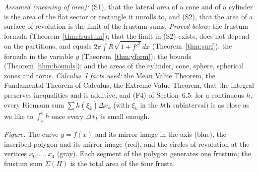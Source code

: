 \documentclass[11pt]{article}
\begin{document}
\begin{remark}
\emph{Assumed (meaning of area):} (S1), that the lateral area of a cone and of a cylinder is the area of the flat sector or rectangle it unrolls to, and (S2), that the area of a surface of revolution is the limit of the frustum sums. \emph{Proved below:} the frustum formula (Theorem~\ref{thm:frustum}); that the limit in (S2) exists, does not depend on the partitions, and equals $2\pi\int R\sqrt{1+f'^2}\,dx$ (Theorem~\ref{thm:surf}); the formula in the variable $y$ (Theorem~\ref{thm:yform}); the bounds (Theorem~\ref{thm:bounds}); and the areas of the cylinder, cone, sphere, spherical zones and torus. \emph{Calculus~I facts used:} the Mean Value Theorem, the Fundamental Theorem of Calculus, the Extreme Value Theorem, that the integral preserves inequalities and is additive, and (F4) of Section~6.5: for a continuous $h$, every Riemann sum $\sum h(\xi_k)\Delta x_k$ (with $\xi_k$ in the $k$th subinterval) is as close as we like to $\int_a^bh$ once every $\Delta x_k$ is small enough.
\end{remark}

\begin{center}
\par\small\emph{Figure.} The curve $y=f(x)$ and its mirror image in the axis (blue), the inscribed polygon and its mirror image (red), and the circles of revolution at the vertices $x_0,\dots,x_4$ (gray). Each segment of the polygon generates one frustum; the frustum sum $\Sigma(\Pi)$ is the total area of the four frusta.
\end{center}
\end{document}
